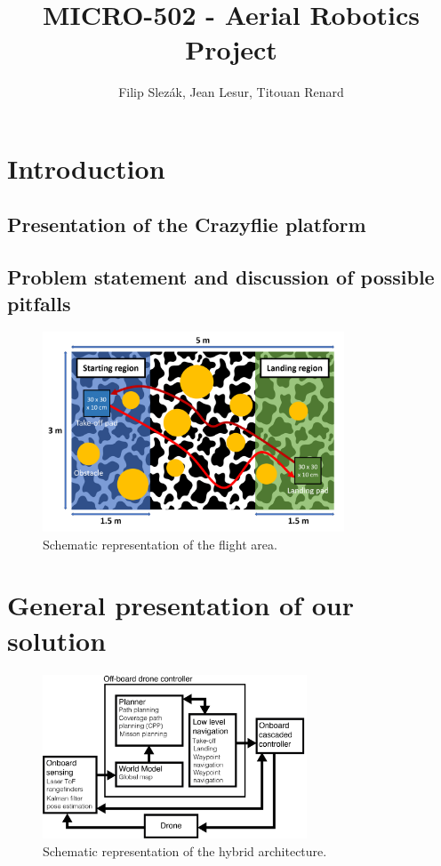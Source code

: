 \documentclass[11pt]{article}
\title{MICRO-502 - Aerial Robotics Project}
\author{Filip Slezák, Jean Lesur, Titouan Renard}
\begin{document}
\maketitle

\section{Introduction}



\subsection{Presentation of the Crazyflie platform}

\subsection{Problem statement and discussion of possible pitfalls}

\begin{figure}[h!]
    \centering
    \includegraphics[width=0.8\textwidth]{figures/crazyfly_objective_figure.png}
    \caption{Schematic representation of the flight area.}
\end{figure}

\section{General presentation of our solution}

\begin{figure}[h!]
    \centering
    \includegraphics[width=0.7\textwidth]{figures/arch.png}
    \caption{Schematic representation of the hybrid architecture.}
\end{figure}
\end{document}
